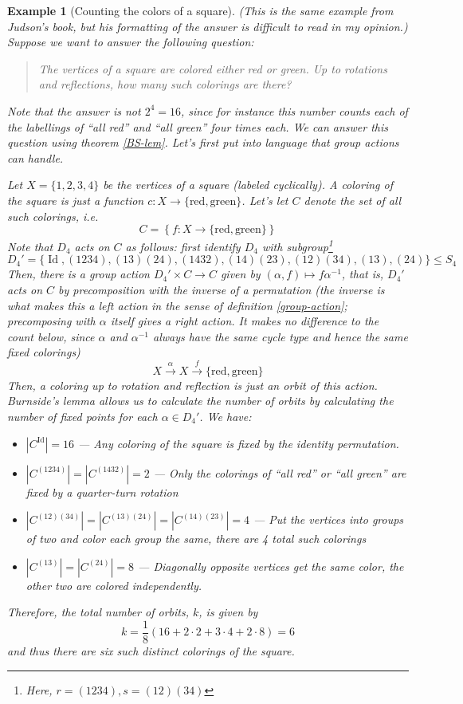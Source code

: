 \documentclass[12pt]{article}
\numberwithin{equation}{subsection}
\theoremstyle{note}
\newtheorem{example}[subsection]{Example}
\newcommand{\Id}{\operatorname{Id}}
\begin{document}
\begin{example}[Counting the colors of a square]
	(This is the same example from Judson's book, but his formatting of the answer is difficult to read in my opinion.) Suppose we want to answer the following question: 
	
	\begin{quote} \textit{The vertices of a square are colored either red or green. Up to rotations and reflections, how many such colorings are there?}\end{quote}
	
	Note that the answer is not $2^4=16$, since for instance this number counts each of the labellings of ``all red'' and ``all green'' four times each. We can answer this question using theorem \ref{BS-lem}. Let's first put into language that group actions can handle. 
	
	Let $X=\{1,2,3,4\}$ be the vertices of a square (labeled cyclically). A \textit{coloring} of the square is just a function $c\colon X\to \{ \text{red}, \text{green}\}$. Let's let $C$ denote the set of all such colorings, i.e. \[ C=\left\{ f\colon X\to \{\text{red}, \text{green}\}\right\}\] Note that $D_4$ acts on $C$ as follows: first identify $D_4$ with subgroup\footnote{Here, $r=(1234), s=(12)(34)$} \[D_4'=\{\Id, (1234), (13)(24), (1432), (14)(23), (12)(34), (13), (24)\}\leq S_4\] Then, there is a group action $D_4'\times C\to C$ given by $(\alpha, f)\mapsto f\alpha^{-1}$, that is, $D_4'$ acts on $C$ by \textit{precomposition} with the inverse of a permutation (the inverse is what makes this a \textit{left} action in the sense of definition \ref{group-action}; precomposing with $\alpha$ itself gives a right action. It makes no difference to the count below, since $\alpha$ and $\alpha^{-1}$ always have the same cycle type and hence the same fixed colorings) \[ X\xrightarrow{\;\alpha\;} X\xrightarrow{\;f\;} \{ \text{red}, \text{green}\}\] Then, a coloring \textit{up to rotation and reflection} is just an \textit{orbit} of this action. Burnside's lemma allows us to calculate the number of orbits by calculating the number of fixed points for each $\alpha\in D_4'$. We have:
	\begin{itemize}
		\item $|C^{\Id}|=16$ --- Any coloring of the square is fixed by the identity permutation.
		\item $|C^{(1234)}|=|C^{(1432)}|=2$ --- Only the colorings of ``all red'' or ``all green'' are fixed by a quarter-turn rotation
		\item $|C^{(12)(34)}|=|C^{(13)(24)}|=|C^{(14)(23)}|=4$ --- Put the vertices into groups of two and color each group the same, there are 4 total such colorings
		\item $|C^{(13)}|=|C^{(24)}|=8$ --- Diagonally opposite vertices get the same color, the other two are colored independently.
	\end{itemize}
	Therefore, the total number of orbits, $k$, is given by \[ k=\dfrac{1}{8}(16+2\cdot2+3\cdot4+2\cdot8)=6\] and thus there are six such distinct colorings of the square. 
\end{example}
\end{document}

